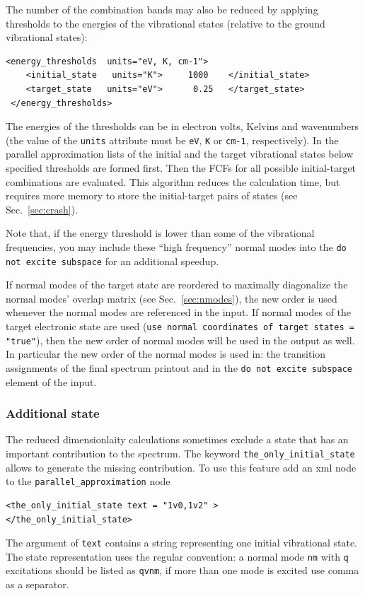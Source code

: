 \documentclass[11pt]{article}
\begin{document}
The number of the combination bands  may also be reduced by applying 
thresholds to the energies of the vibrational states 
(relative to the ground vibrational states):
\begin{lstlisting}[frame=single,framerule=0pt]
 <energy_thresholds  units="eV, K, cm-1">
    <initial_state   units="K">     1000    </initial_state>
    <target_state   units="eV">      0.25   </target_state>
 </energy_thresholds>
\end{lstlisting}
The energies of the thresholds can be in electron volts, Kelvins and wavenumbers 
(the value of the {\tt units} attribute must be {\tt eV}, {\tt K} or {\tt cm-1}, respectively).
In the parallel approximation lists of the initial and the target vibrational states below 
specified thresholds are formed first. 
Then the FCFs for all possible initial-target combinations are evaluated.
This algorithm reduces the calculation time, but requires more memory to store
the initial-target pairs of states (see Sec.~\ref{sec:crash}).

Note that, if the energy threshold is lower than some of the vibrational frequencies, 
you may include these ``high frequency'' normal modes
into the {\tt do not excite subspace} for an additional speedup.

If normal modes of the target state are reordered 
to maximally diagonalize the normal modes' overlap matrix (see Sec.~\ref{sec:nmodes}),  
the new order is used whenever the normal modes are referenced in the input.
If normal modes of the target electronic state are used ({\tt use normal coordinates of target states = "true"}),
then the new order of normal modes will be used in the output as well.
In particular the new order of the normal modes is used in:
the transition assignments of the final spectrum printout and 
in the {\tt do not excite subspace} element of the input.

\subsubsection{Additional state}
\label{sec:para:subspace:single_state}
The reduced dimensionlaity calculations sometimes exclude a state that has an important contribution to the spectrum. The keyword {\tt{}the\_only\_initial\_state} allows to generate the missing contribution. To use this feature add an xml node to the {\tt{}parallel\_approximation} node 
\begin{lstlisting}[frame=single,framerule=0pt]
<the_only_initial_state text = "1v0,1v2" >
</the_only_initial_state>
\end{lstlisting}
The argument of {\tt{}text} contains a string representing one initial vibrational state. The state representation uses the regular convention: a normal mode {\tt{}nm} with {\tt{}q} excitations should be listed as {\tt{}qvnm}, if more than one mode is excited use comma as a separator. 
\end{document}
